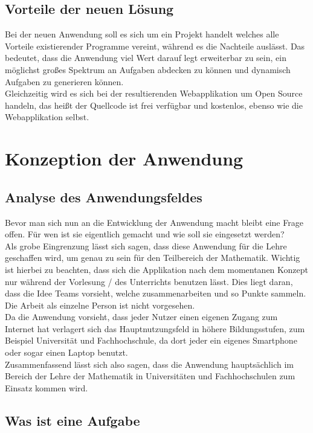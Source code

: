 \section{Vorteile der neuen Lösung}

Bei der neuen Anwendung soll es sich um ein Projekt handelt welches alle Vorteile existierender Programme vereint, während es die Nachteile auslässt. Das bedeutet, dass die Anwendung viel Wert darauf legt erweiterbar zu sein, ein möglichst großes Spektrum an Aufgaben abdecken zu können und dynamisch Aufgaben zu generieren können. \\
Gleichzeitig wird es sich bei der resultierenden Webapplikation um Open Source handeln, das heißt der Quellcode ist frei verfügbar und kostenlos, ebenso wie die Webapplikation selbst.

\chapter{Konzeption der Anwendung}

\section{Analyse des Anwendungsfeldes}

Bevor man sich nun an die Entwicklung der Anwendung macht bleibt eine Frage offen. Für wen ist sie eigentlich gemacht und wie soll sie eingesetzt werden? \\
Als grobe Eingrenzung lässt sich sagen, dass diese Anwendung für die Lehre geschaffen wird, um genau zu sein für den Teilbereich der Mathematik. Wichtig ist hierbei zu beachten, dass sich die Applikation nach dem momentanen Konzept nur während der Vorlesung / des Unterrichts benutzen lässt. Dies liegt daran, dass die Idee Teams vorsieht, welche zusammenarbeiten und so Punkte sammeln. Die Arbeit als einzelne Person ist nicht vorgesehen. \\
Da die Anwendung vorsieht, dass jeder Nutzer einen eigenen Zugang zum Internet hat verlagert sich das Hauptnutzungsfeld in höhere Bildungsstufen, zum Beispiel Universität und Fachhochschule, da dort jeder ein eigenes Smartphone oder sogar einen Laptop benutzt. \\
Zusammenfassend lässt sich also sagen, dass die Anwendung hauptsächlich im Bereich der Lehre der Mathematik in Universitäten und Fachhochschulen zum Einsatz kommen wird.

\section{Was ist eine Aufgabe}

